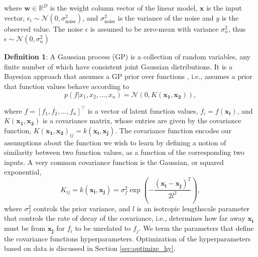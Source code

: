 where $\mathbf{w} \in \mathbb{R}^D$ is the weight column vector of the linear model, $\mathbf{x}$ is the input vector,  $\epsilon_i \sim \mathcal{N}(0, \sigma^2_{\text{noise}})$, and $\sigma^2_{\text{noise}}$ is the variance of the noise and $y$ is the observed value.
The noise $\epsilon$ is assumed to be zero-mean with variance $\sigma^2_n$, thus $\epsilon \sim \mathcal{N}(0, \sigma^2_n)$ 

\textbf{Definition 1}: A Gaussian process (GP) is a collection of random variables, any finite number of which have consistent joint Gaussian distributions. It is a Bayesian approach that assumes a GP prior over functions \cite{quinnonero2007approximation}, i.e., assumes a prior that function values behave according to
\begin{equation}\label{eq:prior_function}
    p(f | x_1, x_2, \ldots, x_n) = \mathcal{N} (0, K(\mathbf{x_1}, \mathbf{x_2})), 
\end{equation}

where $f = [f_1, f_2, \ldots, f_n]^{\top}$ is a vector of latent function values, $f_i = f(\mathbf{x_i})$, and $K(\mathbf{x_1}, \mathbf{x_2})$ is a covariance matrix, whose entries are given by the covariance function, $K(\mathbf{x_1}, \mathbf{x_2})_{ij} = k(\mathbf{x_i}, \mathbf{x_j})$. The covariance function encodes our assumptions about the function we wish to learn by defining a notion of similarity between two function values, as a function of the corresponding two inputs. A very common covariance function is the Gaussian, or squared exponential\cite{williams2006gaussian},
\begin{equation}\label{eq:covariance_function}
    K_{ij} = k(\mathbf{x_i}, \mathbf{x_j}) = \sigma_f^2 \exp\left( -\frac{(\mathbf{x_i} - \mathbf{x_j})^2}{2l^2} \right),
\end{equation}
where $\sigma_f^2$ controls the prior variance, and $l$ is an isotropic lengthscale parameter that controls the rate of decay of the covariance, i.e., determines how far away $\mathbf{x_i}$ must be from $\mathbf{x_j}$ for $f_i$ to be unrelated to $f_j$. We term the parameters that define the covariance functions hyperparameters. Optimization of the hyperparameters based on data is discussed in Section \ref{sec:optimize_hy}.

